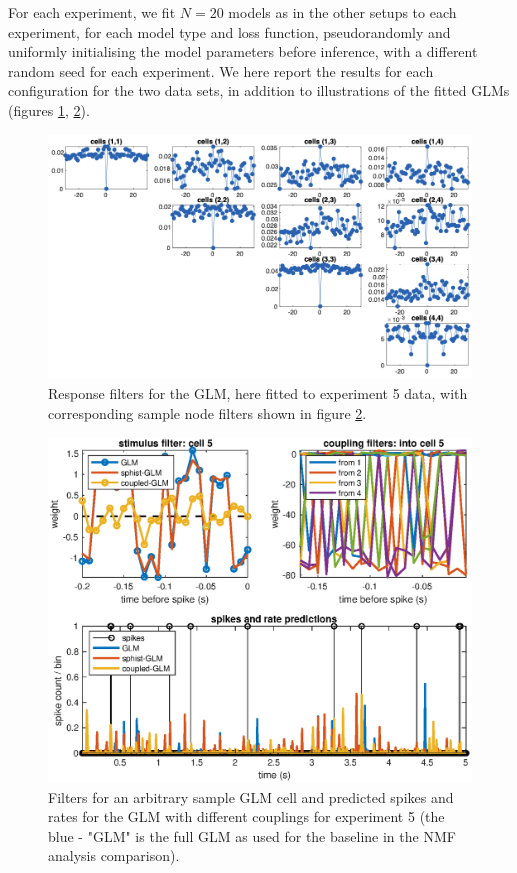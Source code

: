 \documentclass[mphil,deptreport,ianc]{infthesis} %
\begin{document}
For each experiment, we fit $N=20$ models as in the other setups to each experiment, for each model type and loss function, pseudorandomly and uniformly initialising the model parameters before inference, with a different random seed for each experiment.
We here report the results for each configuration for the two data sets, in addition to illustrations of the fitted GLMs (figures \ref{fig:stimulus_response_filters}, \ref{fig:glm_sample_cell_5_exp_5}).

\begin{figure}
    \centering
    \vspace{-0.1in}
    \includegraphics[width=0.9\linewidth]{figures/sleep/plot_1_cell_5_subplot.png}
    \vspace{-0.1in}
    \caption{Response filters for the GLM, here fitted to experiment 5 data, with corresponding sample node filters shown in figure \ref{fig:glm_sample_cell_5_exp_5}.}
    \label{fig:stimulus_response_filters}
\end{figure}

\begin{figure}
    \centering
    \includegraphics[width=0.9\columnwidth]{figures/sleep/GLM_multi_cell5_5sec_bin_white_noise.eps}
    \caption{Filters for an arbitrary sample GLM cell and predicted spikes and rates for the GLM with different couplings for experiment 5 (the blue - "GLM" is the full GLM as used for the baseline in the NMF analysis comparison).}
    \label{fig:glm_sample_cell_5_exp_5}
\end{figure}
\end{document}
